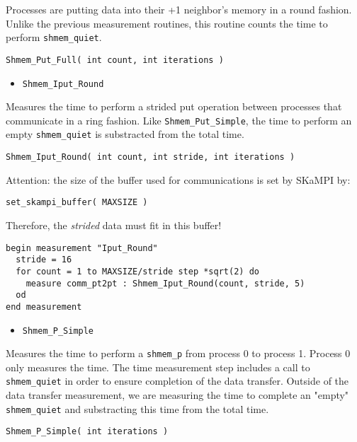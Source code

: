 \documentclass[12pt, letterpaper]{article}
\begin{document}
Processes are putting data into their +1 neighbor's memory in a round fashion. Unlike the previous measurement routines, this routine counts the time to perform {\tt shmem\_quiet}.

\begin{lstlisting}
Shmem_Put_Full( int count, int iterations )
\end{lstlisting}

\begin{itemize}
    \item {\tt Shmem\_Iput\_Round}
\end{itemize}

Measures the time to perform a strided put operation between processes that communicate in a ring fashion. Like {\tt Shmem\_Put\_Simple}, the time to perform an empty {\tt shmem\_quiet} is substracted from the total time.

\begin{lstlisting}
Shmem_Iput_Round( int count, int stride, int iterations )
\end{lstlisting}

Attention: the size of the buffer used for communications is set by SKaMPI by:
\begin{lstlisting}
set_skampi_buffer( MAXSIZE )
\end{lstlisting}

Therefore, the \emph{strided} data must fit in this buffer!

\begin{lstlisting}
begin measurement "Iput_Round"
  stride = 16	  
  for count = 1 to MAXSIZE/stride step *sqrt(2) do
    measure comm_pt2pt : Shmem_Iput_Round(count, stride, 5)
  od
end measurement
\end{lstlisting}

\begin{itemize}
    \item {\tt Shmem\_P\_Simple}
\end{itemize}

Measures the time to perform a {\tt shmem\_p} from process 0 to process 1. Process 0 only measures the time. The time measurement step includes a call to {\tt shmem\_quiet} in order to ensure completion of the data transfer. Outside of the data transfer measurement, we are measuring the time to complete an "empty" {\tt shmem\_quiet} and substracting this time from the total time.

\begin{lstlisting}
Shmem_P_Simple( int iterations )
\end{lstlisting}
\end{document}
